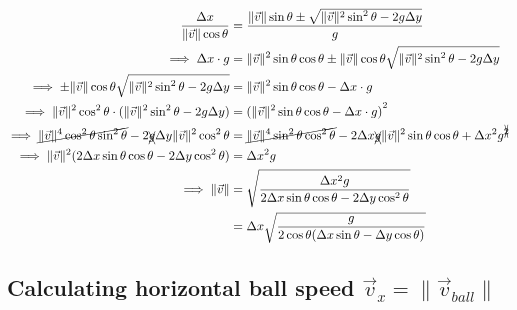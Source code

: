 \documentclass[11pt]{report}
\begin{document}
\[
	\begin{aligned}
		\dfrac{\Delta x}{\|\vec{v}\|\cos\theta}                                                                    & = \frac{\|\vec{v}\|\sin\theta \pm \sqrt{\|\vec{v}\|^2\sin^2\theta - 2g\Delta y}}{g}                                                         \\
		\implies \Delta x \cdot g                                                                                  & = \|\vec{v}\|^2 \sin\theta \cos\theta \pm \|\vec{v}\| \cos\theta \sqrt{\|\vec{v}\|^2\sin^2\theta - 2g\Delta y}                              \\
		\implies \pm \|\vec{v}\| \cos\theta \sqrt{\|\vec{v}\|^2\sin^2\theta - 2g\Delta y}                          & = \|\vec{v}\|^2 \sin\theta \cos\theta-\Delta x\cdot g                                                                                       \\
		\implies \|\vec{v}\|^2\cos^2\theta \cdot (\|\vec{v}\|^2\sin^2\theta - 2g\Delta y)                          & = {(\|\vec{v}\|^2 \sin\theta \cos\theta-\Delta x\cdot g)}^2                                                                                 \\
		\implies \cancel{\|\vec{v}\|^4\cos^2\theta \sin^2\theta} - 2\xcancel{g}\Delta y \|\vec{v}\|^2 \cos^2\theta & = \cancel{\|\vec{v}\|^4 \sin^2\theta \cos^2\theta} - 2\Delta x \xcancel{g} \|\vec{v}\|^2 \sin\theta \cos\theta + \Delta x^2 g^{\xcancel{2}} \\
		\implies  \|\vec{v}\|^2 (2\Delta x \sin\theta \cos\theta - 2\Delta y \cos^2\theta)                         & = \Delta x^2 g                                                                                                                              \\
		\implies \|\vec{v}\|                                                                                       & = \sqrt{\frac{\Delta x^2 g}{2\Delta x \sin\theta \cos\theta - 2\Delta y \cos^2\theta}}                                                      \\
		                                                                                                           & = \Delta x \sqrt{\frac{g}{2\cos\theta (\Delta x \sin\theta - \Delta y \cos\theta) }}
	\end{aligned}
\]

\subsection{Calculating horizontal ball speed \texorpdfstring{$\vec{v}_x = \|\vec{v}_{ball}\|$}{v\_x = ||v\_ball||}}
\end{document}
